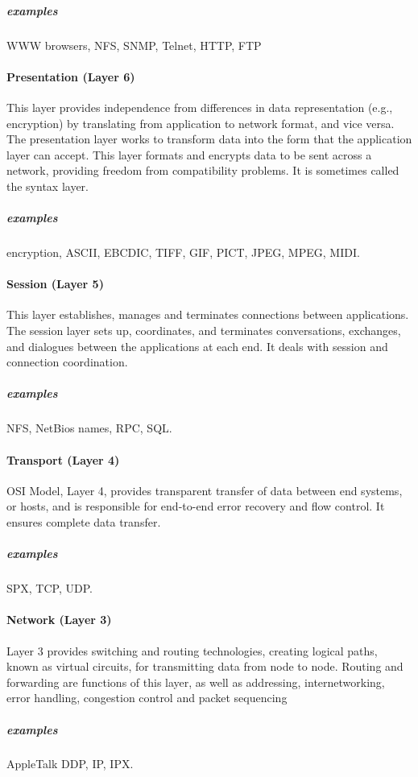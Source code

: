 \documentclass{article}[12pt]
\begin{document}
\subparagraph{examples} WWW browsers, NFS, SNMP, Telnet, HTTP, FTP


\paragraph{Presentation (Layer 6)}
This layer provides independence from differences in data representation (e.g., encryption) by translating from application to network format, and vice versa.
The presentation layer works to transform data into the form that the application layer can accept.
This layer formats and encrypts data to be sent across a network, providing freedom from compatibility problems.
It is sometimes called the syntax layer.

\subparagraph{examples} encryption, ASCII, EBCDIC, TIFF, GIF, PICT, JPEG, MPEG, MIDI.



\paragraph{Session (Layer 5)}
This layer establishes, manages and terminates connections between applications.
The session layer sets up, coordinates, and terminates conversations, exchanges, and dialogues between the applications at each end.
It deals with session and connection coordination.

\subparagraph{examples} NFS, NetBios names, RPC, SQL.



\paragraph{Transport (Layer 4)}
OSI Model, Layer 4, provides transparent transfer of data between end systems, or hosts, and is responsible for end-to-end error recovery and flow control.
It ensures complete data transfer.
\subparagraph{examples} SPX, TCP, UDP.


\paragraph{Network (Layer 3)}

Layer 3 provides switching and routing technologies, creating logical paths, known as virtual circuits, for transmitting data from node to node.
Routing and forwarding are functions of this layer, as well as addressing, internetworking, error handling, congestion control and packet sequencing

\subparagraph{examples} AppleTalk DDP, IP, IPX.
\end{document}
